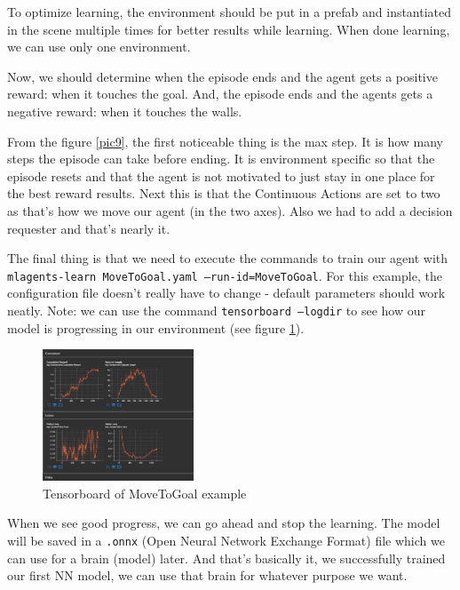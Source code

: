 \documentclass[a4paper, 12pt]{book}
\begin{document}
To optimize learning, the environment should be put in a prefab and instantiated in the scene multiple times for better results while learning. When done learning, we can use only one environment.

Now, we should determine when the episode ends and the agent gets a positive reward: when it touches the goal. 
And, the episode ends and the agents gets a negative reward: when it touches the walls.

From the figure \ref{pic9}, the first noticeable thing is the max step. It is how many steps the episode can take before ending. It is environment specific so that the episode resets and that the agent is not motivated to just stay in one place for the best reward results. Next this is that the Continuous Actions are set to two as that's how we move our agent (in the two axes). Also we had to add a decision requester and that's nearly it.

The final thing is that we need to execute the commands to train our agent with \texttt{mlagents-learn MoveToGoal.yaml --run-id=MoveToGoal}. For this example, the configuration file doesn't really have to change - default parameters should work neatly. Note: we can use the command \texttt{tensorboard --logdir} to see how our model is progressing in our environment (see figure \ref{pic10}).

\begin{figure}[ht]
\begin{center}
\includegraphics[width=0.4\textwidth]{Images/tensorboard.png}
\end{center}
\caption{Tensorboard of MoveToGoal example}
\label{pic10}
\end{figure}

When we see good progress, we can go ahead and stop the learning. The model will be saved in a \texttt{.onnx} (Open Neural Network Exchange Format) file which we can use for a brain (model) later. And that's basically it, we successfully trained our first NN model, we can use that brain for whatever purpose we want.
\end{document}
